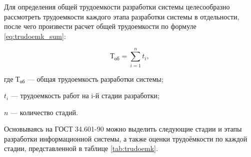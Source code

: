 Для определения общей трудоемкости разработки системы целесообразно рассмотреть трудоемкости каждого этапа разработки системы в отдельности, после чего произвести расчет общей трудоемкости по формуле \ref{eq:trudoemk_sum}:

\begin{equation}
	\label{eq:trudoemk_sum}
	Т_{об} = \sum^{n}_{i=1}t_{i},
\end{equation}
\begin{ESKDexplanation}
	\item где $Т_{об}$ --- общая трудоемкость разработки системы;
	\item $t_{i}$ --- трудоемкость работ на i-й стадии разработки;
	\item $n$ --- количество стадий.
\end{ESKDexplanation}

Основываясь на ГОСТ 34.601-90\cite{gost34601} можно выделить следующие стадии и этапы разработки информационной системы, а также оценки трудоёмкости по каждой стадии, представленной в таблице \ref{tab:trudoemk}.

